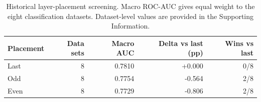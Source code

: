 \begin{table}[t]
\centering
\caption{Historical layer-placement screening. Macro ROC-AUC gives equal weight to the eight classification datasets. Dataset-level values are provided in the Supporting Information.}
\label{tab:layer-placement}
\begin{tabular}{lrrrr}
\toprule
Placement & Data sets & Macro AUC & Delta vs last (pp) & Wins vs last \\
\midrule
Last & 8 & 0.7810 & +0.000 & 0/8 \\
Odd & 8 & 0.7754 & -0.564 & 2/8 \\
Even & 8 & 0.7729 & -0.806 & 2/8 \\
\bottomrule
\end{tabular}
\end{table}
